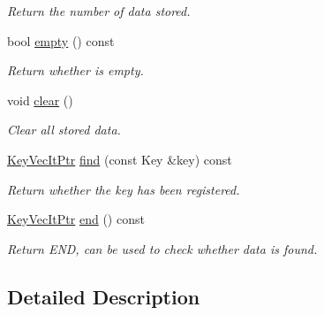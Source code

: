 \begin{DoxyCompactItemize}
\begin{DoxyCompactList}\small\item\em Return the number of data stored. \end{DoxyCompactList}\item 
\mbox{\label{classilang_1_1_key_vec_a14637dc10efd797308125649f8b12d98}} 
bool \mbox{\hyperlink{classilang_1_1_key_vec_a14637dc10efd797308125649f8b12d98}{empty}} () const
\begin{DoxyCompactList}\small\item\em Return whether is empty. \end{DoxyCompactList}\item 
\mbox{\label{classilang_1_1_key_vec_ae8aa6bab5d79a7632e2a19289f0414a2}} 
void \mbox{\hyperlink{classilang_1_1_key_vec_ae8aa6bab5d79a7632e2a19289f0414a2}{clear}} ()
\begin{DoxyCompactList}\small\item\em Clear all stored data. \end{DoxyCompactList}\item 
\mbox{\label{classilang_1_1_key_vec_a3625e3c2ec9c5afa3cf5567cc27089d9}} 
\mbox{\hyperlink{classilang_1_1_key_vec_ab09bb9eca1480923cb6c88e709764935}{Key\+Vec\+It\+Ptr}} \mbox{\hyperlink{classilang_1_1_key_vec_a3625e3c2ec9c5afa3cf5567cc27089d9}{find}} (const Key \&key) const
\begin{DoxyCompactList}\small\item\em Return whether the key has been registered. \end{DoxyCompactList}\item 
\mbox{\label{classilang_1_1_key_vec_a6e95f1a9e9df206f1ca6cd478ce6655b}} 
\mbox{\hyperlink{classilang_1_1_key_vec_ab09bb9eca1480923cb6c88e709764935}{Key\+Vec\+It\+Ptr}} \mbox{\hyperlink{classilang_1_1_key_vec_a6e95f1a9e9df206f1ca6cd478ce6655b}{end}} () const
\begin{DoxyCompactList}\small\item\em Return E\+ND, can be used to check whether data is found. \end{DoxyCompactList}\end{DoxyCompactItemize}


\subsection{Detailed Description}

